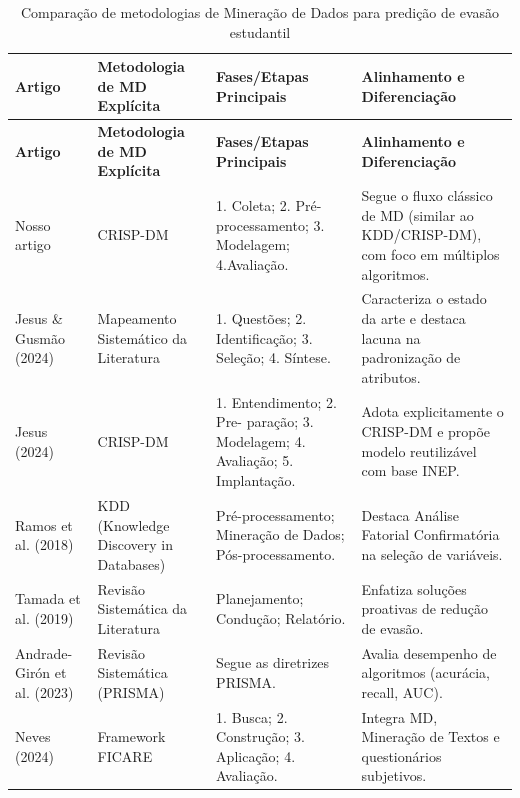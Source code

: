 \documentclass[english, spanish, brazilian]{RBIEarticle} %
\begin{document}
\begin{longtable}{|p{3cm}|p{3.5cm}|p{4.5cm}|p{5cm}|}
    \caption{Comparação de metodologias de Mineração de Dados para predição de evasão estudantil}\\
    \toprule
    \textbf{Artigo} & \textbf{Metodologia de MD Explícita} & \textbf{Fases/Etapas Principais} & \textbf{Alinhamento e Diferenciação} \\
    \midrule
    \endfirsthead
    \toprule
    \textbf{Artigo} & \textbf{Metodologia de MD Explícita} & \textbf{Fases/Etapas Principais} & \textbf{Alinhamento e Diferenciação} \\
    \midrule
    \endhead
    Nosso artigo & CRISP-DM & 1. Coleta; 2. Pré-processamento; 3. Modelagem; 4.Avaliação. & Segue o fluxo clássico de MD (similar ao KDD/CRISP-DM), com foco em múltiplos algoritmos. \\ \hline
    
    Jesus \& Gusmão (2024) & Mapeamento Sistemático da Literatura & 1. Questões; 2. Identificação; 3. Seleção; 4. Síntese. & Caracteriza o estado da arte e destaca lacuna na padronização de atributos. \\ \hline
    
    Jesus (2024) & CRISP-DM & 1. Entendimento; 2. Pre- paração; 3. Modelagem; 4. Avaliação; 5. Implantação. & Adota explicitamente o CRISP-DM e propõe modelo reutilizável com base INEP. \\ \hline
    
    Ramos et al. (2018) & KDD (Knowledge Discovery in Databases) & Pré-processamento; Mineração de Dados; Pós-processamento. & Destaca Análise Fatorial Confirmatória na seleção de variáveis. \\ \hline
    
    Tamada et al. (2019) & Revisão Sistemática da Literatura & Planejamento; Condução; Relatório. & Enfatiza soluções proativas de redução de evasão. \\ \hline
    
    Andrade-Girón et al. (2023) & Revisão Sistemática (PRISMA) & Segue as diretrizes PRISMA. & Avalia desempenho de algoritmos (acurácia, recall, AUC). \\ \hline
    
    Neves (2024) & Framework FICARE & 1. Busca; 2. Construção; 3. Aplicação; 4. Avaliação. & Integra MD, Mineração de Textos e questionários subjetivos. \\
    \bottomrule
\end{longtable}
\end{document}
